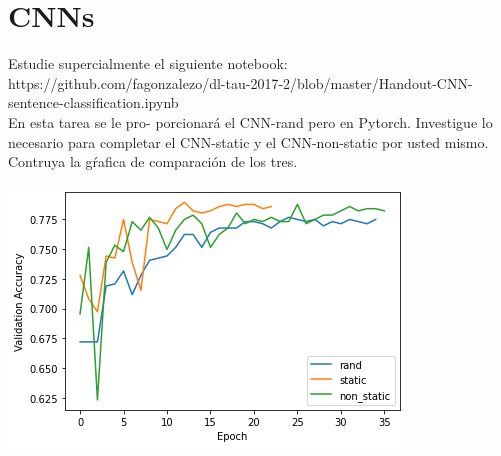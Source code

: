 \documentclass[11pt,letterpaper]{article}
\theoremstyle{definition}
\theoremstyle{definition}
\theoremstyle{definition}
\begin{document}
\section{CNNs}
Estudie supercialmente el siguiente notebook:
\\ https://github.com/fagonzalezo/dl-tau-2017-2/blob/master/Handout-CNN-sentence-classification.ipynb 
\\
En esta tarea se le pro-
porcionará el CNN-rand pero en Pytorch. Investigue lo necesario para completar el CNN-static y el CNN-non-static por usted mismo. Contruya la gŕafica de comparación de los tres.
\begin{center}
	\includegraphics[width=0.7\linewidth]{comparation_cnn}
\end{center}
\end{document}
